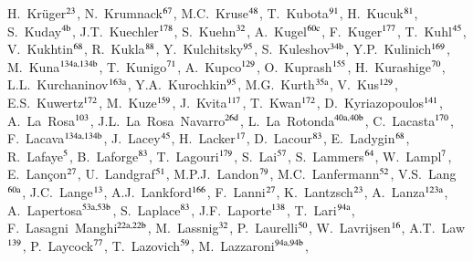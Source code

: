 \begin{flushleft}
H.~Kr\"uger$^\textrm{\scriptsize 23}$,
N.~Krumnack$^\textrm{\scriptsize 67}$,
M.C.~Kruse$^\textrm{\scriptsize 48}$,
T.~Kubota$^\textrm{\scriptsize 91}$,
H.~Kucuk$^\textrm{\scriptsize 81}$,
S.~Kuday$^\textrm{\scriptsize 4b}$,
J.T.~Kuechler$^\textrm{\scriptsize 178}$,
S.~Kuehn$^\textrm{\scriptsize 32}$,
A.~Kugel$^\textrm{\scriptsize 60c}$,
F.~Kuger$^\textrm{\scriptsize 177}$,
T.~Kuhl$^\textrm{\scriptsize 45}$,
V.~Kukhtin$^\textrm{\scriptsize 68}$,
R.~Kukla$^\textrm{\scriptsize 88}$,
Y.~Kulchitsky$^\textrm{\scriptsize 95}$,
S.~Kuleshov$^\textrm{\scriptsize 34b}$,
Y.P.~Kulinich$^\textrm{\scriptsize 169}$,
M.~Kuna$^\textrm{\scriptsize 134a,134b}$,
T.~Kunigo$^\textrm{\scriptsize 71}$,
A.~Kupco$^\textrm{\scriptsize 129}$,
O.~Kuprash$^\textrm{\scriptsize 155}$,
H.~Kurashige$^\textrm{\scriptsize 70}$,
L.L.~Kurchaninov$^\textrm{\scriptsize 163a}$,
Y.A.~Kurochkin$^\textrm{\scriptsize 95}$,
M.G.~Kurth$^\textrm{\scriptsize 35a}$,
V.~Kus$^\textrm{\scriptsize 129}$,
E.S.~Kuwertz$^\textrm{\scriptsize 172}$,
M.~Kuze$^\textrm{\scriptsize 159}$,
J.~Kvita$^\textrm{\scriptsize 117}$,
T.~Kwan$^\textrm{\scriptsize 172}$,
D.~Kyriazopoulos$^\textrm{\scriptsize 141}$,
A.~La~Rosa$^\textrm{\scriptsize 103}$,
J.L.~La~Rosa~Navarro$^\textrm{\scriptsize 26d}$,
L.~La~Rotonda$^\textrm{\scriptsize 40a,40b}$,
C.~Lacasta$^\textrm{\scriptsize 170}$,
F.~Lacava$^\textrm{\scriptsize 134a,134b}$,
J.~Lacey$^\textrm{\scriptsize 45}$,
H.~Lacker$^\textrm{\scriptsize 17}$,
D.~Lacour$^\textrm{\scriptsize 83}$,
E.~Ladygin$^\textrm{\scriptsize 68}$,
R.~Lafaye$^\textrm{\scriptsize 5}$,
B.~Laforge$^\textrm{\scriptsize 83}$,
T.~Lagouri$^\textrm{\scriptsize 179}$,
S.~Lai$^\textrm{\scriptsize 57}$,
S.~Lammers$^\textrm{\scriptsize 64}$,
W.~Lampl$^\textrm{\scriptsize 7}$,
E.~Lan\c{c}on$^\textrm{\scriptsize 27}$,
U.~Landgraf$^\textrm{\scriptsize 51}$,
M.P.J.~Landon$^\textrm{\scriptsize 79}$,
M.C.~Lanfermann$^\textrm{\scriptsize 52}$,
V.S.~Lang$^\textrm{\scriptsize 60a}$,
J.C.~Lange$^\textrm{\scriptsize 13}$,
A.J.~Lankford$^\textrm{\scriptsize 166}$,
F.~Lanni$^\textrm{\scriptsize 27}$,
K.~Lantzsch$^\textrm{\scriptsize 23}$,
A.~Lanza$^\textrm{\scriptsize 123a}$,
A.~Lapertosa$^\textrm{\scriptsize 53a,53b}$,
S.~Laplace$^\textrm{\scriptsize 83}$,
J.F.~Laporte$^\textrm{\scriptsize 138}$,
T.~Lari$^\textrm{\scriptsize 94a}$,
F.~Lasagni~Manghi$^\textrm{\scriptsize 22a,22b}$,
M.~Lassnig$^\textrm{\scriptsize 32}$,
P.~Laurelli$^\textrm{\scriptsize 50}$,
W.~Lavrijsen$^\textrm{\scriptsize 16}$,
A.T.~Law$^\textrm{\scriptsize 139}$,
P.~Laycock$^\textrm{\scriptsize 77}$,
T.~Lazovich$^\textrm{\scriptsize 59}$,
M.~Lazzaroni$^\textrm{\scriptsize 94a,94b}$,

\end{flushleft}
